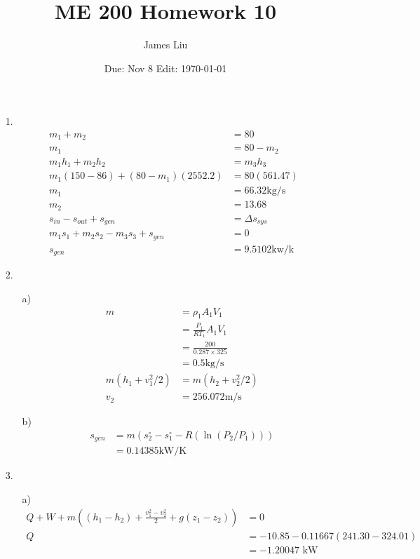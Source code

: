 \documentclass{article}
\date{Due: Nov 8 Edit: \today}
\title{ME 200 Homework 10}
\author{James Liu}
\begin{document}
\maketitle
\begin{itemize}
    \item [1.] 
    \begin{align*}
        m_1+m_2&=80\\
        m_1 &=80-m_2\\
        m_1h_1+m_2h_2&=m_3h_3\\
        m_1(150-86)+(80-m_1)(2552.2)&=80(561.47)\\
        m_1 &= 66.32 \text{kg/s}\\
        m_2 &= 13.68\\
        s_{in}-s_{out}+s_{gen}&=\Delta s_{sys}\\
        m_1s_1+m_2s_2-m_3s_3+s_{gen}&=0\\
        s_{gen}&=9.5102 \text{kw/k}
    \end{align*}
    \item [2.]
    \begin{itemize}
        \item [a)]
        \begin{align*}
            m &=\rho_1A_1V_1\\
            &=\frac{P_1}{RT_1}A_1V_1\\
            &=\frac{200}{0.287\times 325}\\
            &=0.5 \text{kg/s}\\
            m(h_1+v_1^2/2)&=m(h_2+v_2^2/2)\\
            v_2&=256.072 \text{m/s}
        \end{align*}
        \item [b)]
        \begin{align*}
            s_{gen}&=m(s^\circ_2-s^\circ_1-R(\ln(P_2/P_1)))\\
            &=0.14385 \text{kW/K}
        \end{align*}
    \end{itemize}
    \item [3.]
    \begin{itemize}
        \item [a)]
        \begin{align*}
            Q+W+m((h_1-h_2)+\frac{v_1^2-v_2^2}{2}+g(z_1-z_2))&=0\\
            Q&=-10.85-0.11667(241.30-324.01)\\
            &=-1.20047 \text{ kW}
        \end{align*}

\end{itemize}
\end{itemize}
\end{document}
